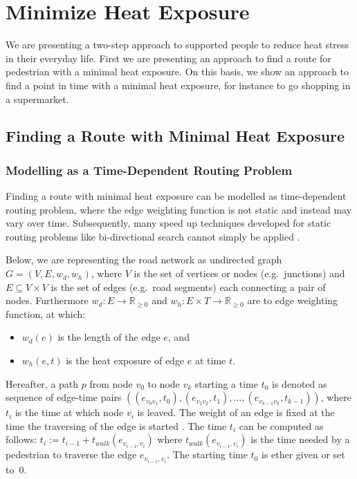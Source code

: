 
\section{Minimize Heat Exposure}

We are presenting a two-step approach to supported people to reduce heat stress in their everyday life. First we are presenting an approach to find a route for pedestrian with a minimal heat exposure. On this basis, we show an approach to find a point in time with a minimal heat exposure, for instance to go shopping in a supermarket.

\subsection{Finding a Route with Minimal Heat Exposure \label{sec:optimal-route}}

\subsubsection{Modelling as a Time-Dependent Routing Problem}

Finding a route with minimal heat exposure can be modelled as time-dependent routing problem, where the edge weighting function is not static and instead may vary over time. Subsequently, many speed up techniques developed for static routing problems like bi-directional search cannot simply be applied \parencite{Delling2009}. 

Below, we are representing the road network as undirected graph $G=(V,E,w_d,w_h)$, where $V$ is the set of vertices or nodes (e.g.\ junctions) and $E\subseteq V\times V$ is the set of edges (e.g.\ road segments) each connecting a pair of nodes. Furthermore $w_d: E \to \mathbb{R}_{\geq 0}$ and $w_h: E \times T \to \mathbb{R}_{\geq 0}$ are to edge weighting function, at which:
\begin{itemize}
	\item $w_d(e)$ is the length of the edge $e$, and
	\item $w_h(e, t)$ is the heat exposure of edge $e$ at time $t$.
\end{itemize}   
Hereafter, a path $p$ from node $v_0$ to node $v_k$ starting a time $t_0$ is denoted as sequence of edge-time pairs $((e_{v_0v_1},t_0),(e_{v_1v_2},t_1),\dots, (e_{v_{k-1}v_k},t_{k-1}))$, where $t_i$ is the time at which node $v_i$ is leaved. The weight of an edge is fixed at the time the traversing of the edge is started \parencite[the so-called frozen link model,][]{Orda1990}. The time $t_i$ can be computed as follows: $t_i := t_{i-1} + t_{walk}(e_{v_{i-1},v_i})$ where $t_{walk}(e_{v_{i-1},v_i})$ is the time needed by a pedestrian to traverse the edge $e_{v_{i-1},v_i}$. The starting time $t_0$ is ether given or set to~$0$. 


